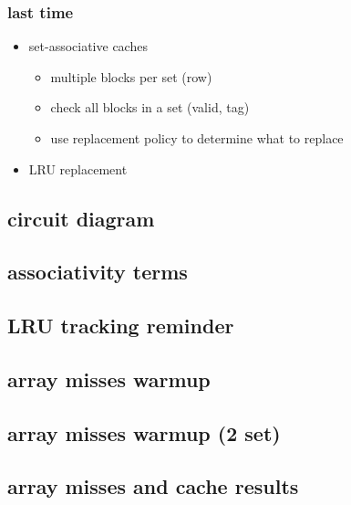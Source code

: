 \date{}
\title{}
\date{}

\begin{frame}
    \titlepage
\end{frame}

\begin{frame}
\frametitle{last time}
    \begin{itemize}
    \item set-associative caches
        \begin{itemize}
        \item multiple blocks per set (row)
        \item check all blocks in a set (valid, tag)
        \item use replacement policy to determine what to replace
        \end{itemize}
    \item LRU replacement
    \end{itemize}
\end{frame}


\usetikzlibrary{calc,positioning}



\subsection{circuit diagram}


\subsection{associativity terms}


\subsection{LRU tracking reminder}


\subsection{array misses warmup}


\subsection{array misses warmup (2 set)}


\subsection{array misses and cache results}


